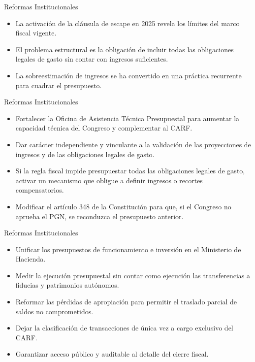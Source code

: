 \begin{frame}{Reformas Institucionales}
\begin{itemize}
    \item La activación de la cláusula de escape en 2025 revela los límites del marco fiscal vigente.
    \item El problema estructural es la obligación de incluir todas las obligaciones legales de gasto sin contar con ingresos suficientes.
    \item La sobreestimación de ingresos se ha convertido en una práctica recurrente para cuadrar el presupuesto.
\end{itemize}
\end{frame}

\begin{frame}{Reformas Institucionales}
\begin{itemize}
    \item Fortalecer la Oficina de Asistencia Técnica Presupuestal para aumentar la capacidad técnica del Congreso y complementar al CARF.
    \item Dar carácter independiente y vinculante a la validación de las proyecciones de ingresos y de las obligaciones legales de gasto.
    \item Si la regla fiscal impide presupuestar todas las obligaciones legales de gasto, activar un mecanismo que obligue a definir ingresos o recortes compensatorios.
    \item Modificar el artículo 348 de la Constitución para que, si el Congreso no aprueba el PGN, se reconduzca el presupuesto anterior.
\end{itemize}
\end{frame}

\begin{frame}{Reformas Institucionales}
\begin{itemize}
    \item Unificar los presupuestos de funcionamiento e inversión en el Ministerio de Hacienda.
    \item Medir la ejecución presupuestal sin contar como ejecución las transferencias a fiducias y patrimonios autónomos.
    \item Reformar las pérdidas de apropiación para permitir el traslado parcial de saldos no comprometidos.
    \item Dejar la clasificación de transacciones de única vez a cargo exclusivo del CARF.
    \item Garantizar acceso público y auditable al detalle del cierre fiscal.
\end{itemize}
\end{frame}